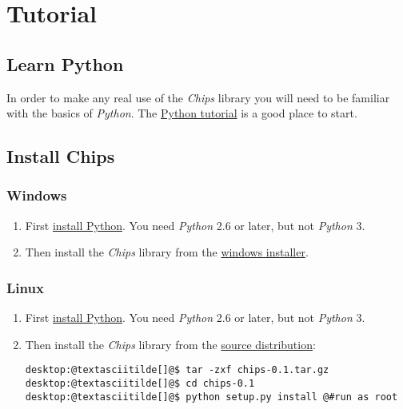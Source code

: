 \documentclass[letterpaper,10pt,english]{sphinxmanual}
\begin{document}
\section{Tutorial}
\label{tutorial/index::doc}\label{tutorial/index:tutorial}

\subsection{Learn Python}
\label{tutorial/index:learn-python}
In order to make any real use of the \emph{Chips} library you will need to be
familiar with the basics of \emph{Python}. The \href{http://docs.python.org/tut}{Python tutorial} is a good place
to start.


\subsection{Install Chips}
\label{tutorial/index:python-tutorial}\label{tutorial/index:install-chips}

\subsubsection{Windows}
\label{tutorial/index:windows}\begin{enumerate}
\item {} 
First \href{http://python.org/download}{install Python}. You need \emph{Python} 2.6 or later, but not \emph{Python} 3.

\item {} 
Then install the \emph{Chips} library from the \href{https://github.com/downloads/dawsonjon/chips/Chips-0.1.win32.exe}{windows installer}.

\end{enumerate}


\subsubsection{Linux}
\label{tutorial/index:linux}\begin{enumerate}
\item {} 
First \href{http://python.org/download}{install Python}. You need \emph{Python} 2.6 or later, but not \emph{Python} 3.

\item {} 
Then install the \emph{Chips} library from the \href{https://github.com/downloads/dawsonjon/chips/Chips-0.1.tar.gz}{source distribution}:

\begin{Verbatim}[commandchars=@\[\]]
desktop:@textasciitilde[]@$ tar -zxf chips-0.1.tar.gz
desktop:@textasciitilde[]@$ cd chips-0.1
desktop:@textasciitilde[]@$ python setup.py install @#run as root
\end{Verbatim}

\end{enumerate}
\end{document}
